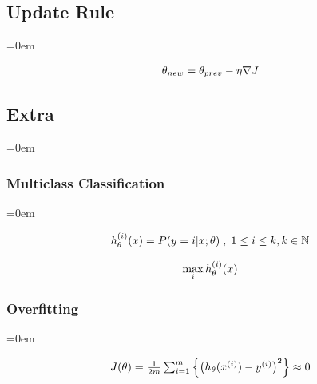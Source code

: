 \pagebreak
\subsectionend
\subsection{Update Rule}
\label{ssec:update_rule}
\parindent=0em

\[
	\begin{array}{ l@{} l@{} } 
	\theta_{new} = \theta_{prev} - \eta \nabla J 
	\end{array}
\]

\subsectionend

\subsection{Extra}
\label{ssec:extra}
\parindent=0em

\subsubsection{Multiclass Classification}
\label{sssec:multiclass_classification}
\parindent=0em

		\[
			\begin{array}{ l@{} l@{} }
				h_\theta^{(i)}(x) = P(y=i|x;\theta) \; , \; 1 \leq i \leq k , k
				\in \mathbb{N}
			\end{array}
		\]

		
		\[
			\begin{array}{ l@{} l@{} }
				\max\limits_i h_\theta^{(i)}(x) &
			\end{array}
		\]

\pagebreak
\subsubsectionend
\subsubsection{Overfitting}
\label{sssec:overfitting}
\parindent=0em

	\[
		\begin{array}{ l@{} l@{} }


			J(\theta)
			= \frac{1}{2m}
			\sum_{i=1}^m
			\left\{
				\left(
					h_\theta(x^{(i)}) - y^{(i)}
				\right)^{2}
			\right\}

			\approx 0


		\end{array}
	\]

